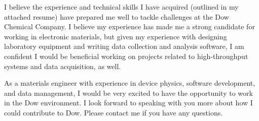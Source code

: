 \documentclass[11pt,a4paper]{moderncv}        %
\begin{document}
I believe the experience and technical skills I have acquired (outlined in my attached resume) have prepared me well to tackle challenges at the Dow Chemical Company.  I believe my experience has made me a strong candidate for working in electronic materials, but given my experience with designing laboratory equipment and writing data collection and analysis software, I am confident I would be beneficial working on projects related to high-throughput systems and data acquisition, as well.

As a materials engineer with experience in device physics, software development, and data management, I would be very excited to have the opportunity to work in the Dow environment.  I look forward to speaking with you more about how I could contribute to Dow.  Please contact me if you have any questions.



\makeletterclosing
\end{document}
